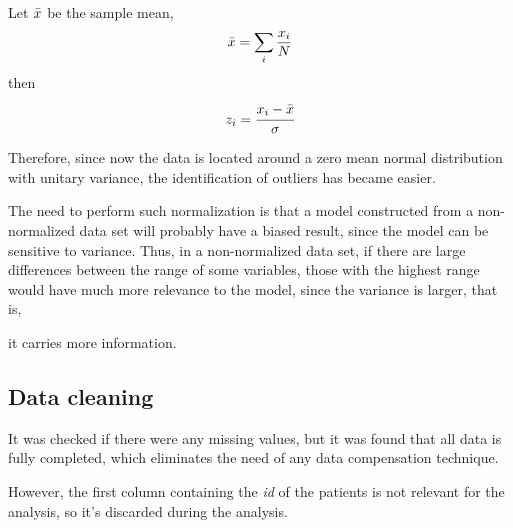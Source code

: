 \documentclass[conference]{IEEEtran}
\begin{document}
Let $\Bar{x}$ be the sample mean,
$$\Bar{x} = \sum_i \frac{x_i}{N}$$
then
$$z_i = \cfrac{x_i - \Bar{x}}{\sigma}$$

Therefore, since now the data is located around a zero mean normal distribution with 
unitary variance, the identification of outliers has became easier.

The need to perform such normalization is that a model constructed from a 
non-normalized data set will probably have a biased result, since the model can be 
sensitive to variance. Thus, in a non-normalized data set, if there are large 
differences between the range of some variables, those with the highest range would 
have much more relevance to the model, since the variance is larger, that is, 

it carries more information.

\subsection{Data cleaning}\label{AA}
It was checked if there were any missing values, but it was found that all data is fully completed, 
which eliminates the need of any data compensation technique.

However, the first column containing the \textit{id} of the patients is not relevant for the analysis, so it's discarded during the analysis.
\end{document}
